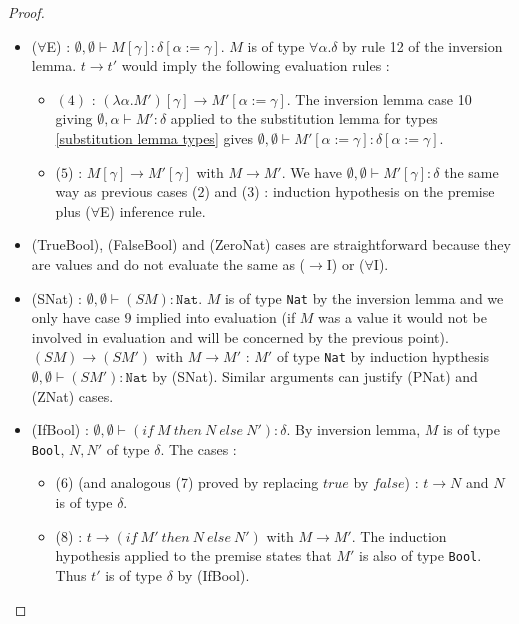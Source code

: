 \documentclass{article}
\begin{document}
\begin{proof}
\begin{itemize}
            \item ($\forall$E) : $\emptyset,\emptyset\vdash M [\gamma] : \delta[\alpha:=\gamma]$. $M$ is of type $\forall \alpha. \delta$ by rule 12 of the inversion lemma. $t\rightarrow t'$ would imply the following evaluation rules :
            \begin{itemize}
                \item $(4)$ : $(\lambda \alpha.M') [\gamma]\rightarrow M'[\alpha:=\gamma]$. The inversion lemma case 10 giving $\emptyset,\alpha\vdash M' : \delta$ applied to the substitution lemma for types \ref{substitution lemma types} gives $\emptyset,\emptyset\vdash M'[\alpha:=\gamma] : \delta[\alpha:=\gamma]$.

                \item ($5$) : $M[\gamma] \rightarrow M'[\gamma]$ with $M \rightarrow M'$. We have $\emptyset,\emptyset\vdash M'[\gamma] : \delta$ the same way as previous cases ($2$) and ($3$) : induction hypothesis on the premise plus ($\forall$E) inference rule.
            \end{itemize}

            \item (TrueBool), (FalseBool) and (ZeroNat) cases are straightforward because they are values and do not evaluate the same as ($\rightarrow$I) or ($\forall$I).

            \item (SNat) : $\emptyset,\emptyset\vdash (S M) : \texttt{Nat}$. $M$ is of type \texttt{Nat} by the inversion lemma and we only have case $9$ implied into evaluation (if $M$ was a value it would not be involved in evaluation and will be concerned by the previous point).  $(S M)\rightarrow (S M') $ with $M \rightarrow M'$ : $M'$ of type \texttt{Nat} by induction hypthesis $\emptyset,\emptyset\vdash (S M') : \texttt{Nat}$ by (SNat). Similar arguments can justify (PNat) and (ZNat) cases.

            \item (IfBool) : $\emptyset,\emptyset\vdash (if \ M \ then \ N \ else \ N') : \delta$. By inversion lemma, $M$ is of type \texttt{Bool}, $N,N'$ of type $\delta$. The cases :
            \begin{itemize}
                \item (6) (and analogous (7) proved by replacing $true$ by $false$) : $t \rightarrow N$ and $N$ is of type $\delta$.
                
                \item (8) : $t \rightarrow (if \ M' \ then \ N \ else \ N')$ with $M\rightarrow M'$. The induction hypothesis applied to the premise states that $M'$ is also of type \texttt{Bool}. Thus $t'$ is of type $\delta$ by (IfBool).
            \end{itemize}
        \end{itemize}
    \end{proof}
\newpage
\end{document}
